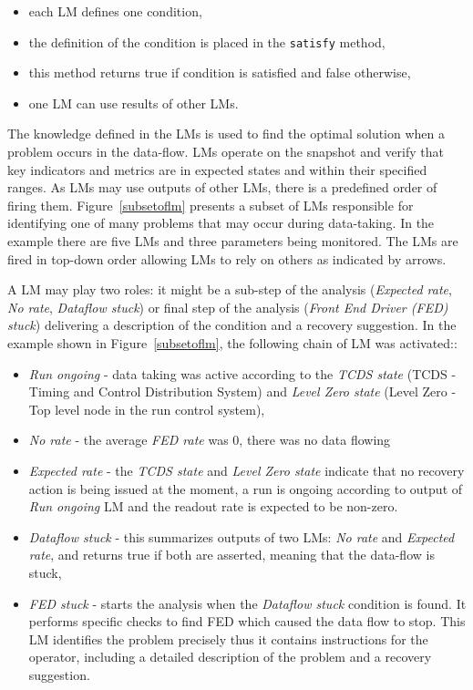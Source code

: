 \documentclass[a4paper]{jpconf}
\begin{document}
\begin{itemize}
\itemsep0em
\item each LM defines one condition,
\item the definition of the condition is placed in the {\tt satisfy} method,
\item this method returns true if condition is satisfied and false otherwise,
\item one LM can use results of other LMs.
\end{itemize}

The knowledge defined in the LMs is used to find the optimal solution when a problem occurs in the data-flow. LMs operate on the snapshot and verify that key indicators and metrics are in expected states and within their specified ranges. As LMs may use outputs of other LMs, there is a predefined order of firing them. Figure~\ref{subsetoflm} presents a subset of LMs responsible for identifying one of many problems that may occur during data-taking. In the example there are five LMs and three parameters being monitored. The LMs are fired in top-down order allowing LMs to rely on others as indicated by arrows.


A LM may play two roles: it might be a sub-step of the analysis ({\it Expected rate}, {\it No rate}, {\it Dataflow stuck}) or final step of the analysis ({\it Front End Driver (FED) stuck}) delivering a description of the condition and a recovery suggestion. In the example shown in Figure~\ref{subsetoflm}, the following chain of LM was activated::

\begin{itemize}
\item {\it Run ongoing} -  data taking was active according to the {\it TCDS state} (TCDS - Timing and Control Distribution System) and{ \it Level Zero state} (Level Zero - Top level node in the run control system),
\item{\it No rate} - the average {\it FED rate} was 0, there was no data flowing
\item{\it Expected rate} - the {\it TCDS state}  and {\it Level Zero state} indicate that no recovery action is being issued at the moment, a run is ongoing according to output of {\it Run ongoing} LM and the readout rate is expected to be non-zero.
\item {\it Dataflow stuck} - this summarizes outputs of two LMs: {\it No rate} and {\it Expected rate}, and returns true if both are asserted, meaning that the data-flow is stuck,
\item {\it FED stuck} - starts the analysis when the {\it Dataflow stuck} condition is found. It performs specific checks to find FED which caused the data flow to stop. This LM identifies the problem precisely thus it contains instructions for the operator, including a detailed description of the problem and a recovery suggestion.
\end{itemize}
\end{document}
